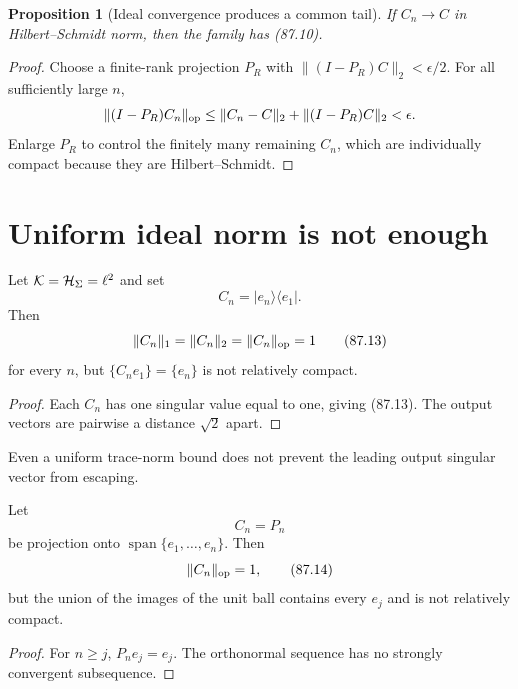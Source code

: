\documentclass[11pt]{article}
\newtheorem{proposition}[theorem]{Proposition}
\theoremstyle{remark}
\begin{document}
\begin{proposition}[Ideal convergence produces a common tail]
\label{prop:v15v87-convergence-tail}
If \(C_n\to C\) in Hilbert--Schmidt norm, then the family has
(87.10).
\end{proposition}

\begin{proof}
Choose a finite-rank projection \(P_R\) with
\(\|(I-P_R)C\|_2<\epsilon/2\).  For all sufficiently large \(n\),
\[
 \|(I-P_R)C_n\|_{\rm op}
 \leq\|C_n-C\|_2+\|(I-P_R)C\|_2<\epsilon.
\]
Enlarge \(P_R\) to control the finitely many remaining \(C_n\),
which are individually compact because they are Hilbert--Schmidt.
\end{proof}

\section{Uniform ideal norm is not enough}

\begin{counterexample}
\label{cnt:v15v87-rank-one}
Let \({\cal K}={\cal H}_\Sigma=\ell^2\) and set
\[
 C_n=|e_n\rangle\langle e_1|.                         \tag{87.12}
\]
Then
\[
 \|C_n\|_1=\|C_n\|_2=\|C_n\|_{\rm op}=1              \tag{87.13}
\]
for every \(n\), but
\(\{C_ne_1\}=\{e_n\}\) is not relatively compact.
\end{counterexample}

\begin{proof}
Each \(C_n\) has one singular value equal to one, giving (87.13).
The output vectors are pairwise a distance \(\sqrt2\) apart.
\end{proof}

Even a uniform trace-norm bound does not prevent the leading output
singular vector from escaping.

\begin{counterexample}
\label{cnt:v15v87-growing-rank}
Let
\[
 C_n=P_n
\]
be projection onto
\(\operatorname{span}\{e_1,\ldots,e_n\}\).  Then
\[
 \|C_n\|_{\rm op}=1,                                  \tag{87.14}
\]
but the union of the images of the unit ball contains every
\(e_j\) and is not relatively compact.
\end{counterexample}

\begin{proof}
For \(n\geq j\), \(P_ne_j=e_j\).  The orthonormal sequence has no
strongly convergent subsequence.
\end{proof}
\end{document}
